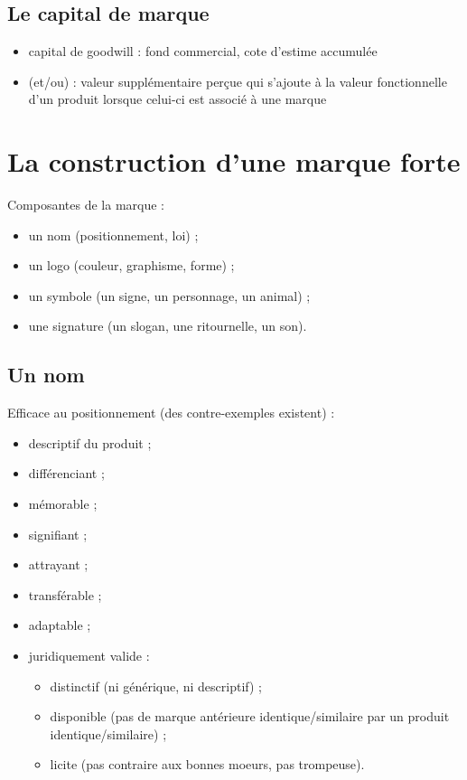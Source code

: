 		\subsection{Le capital de marque}
	
		\begin{itemize}
			\item capital de goodwill : fond commercial, cote d'estime accumulée
			\item (et/ou) : valeur supplémentaire perçue qui s'ajoute à la valeur fonctionnelle d'un produit lorsque celui-ci est associé à une marque
		\end{itemize}
		
	\section{La construction d'une marque forte}
	
	Composantes de la marque :
	
	\begin{itemize}
		\item un nom (positionnement, loi) ;
		\item un logo (couleur, graphisme, forme) ;
		\item un symbole (un signe, un personnage, un animal) ;
		\item une signature (un slogan, une ritournelle, un son).
	\end{itemize}
	
		\subsection{Un nom}
		
		Efficace au positionnement (des contre-exemples existent) :
		
		\begin{itemize}
			\item descriptif du produit ;
			\item différenciant ;
			\item mémorable ;
			\item signifiant ;
			\item attrayant ;
			\item transférable ;
			\item adaptable ;
			\item juridiquement valide : 
			
			\begin{itemize}
				\item distinctif (ni générique, ni descriptif) ;
				\item disponible (pas de marque antérieure identique/similaire par un produit identique/similaire) ;
				\item licite (pas contraire aux bonnes moeurs, pas trompeuse).
			\end{itemize}
		\end{itemize}
		
